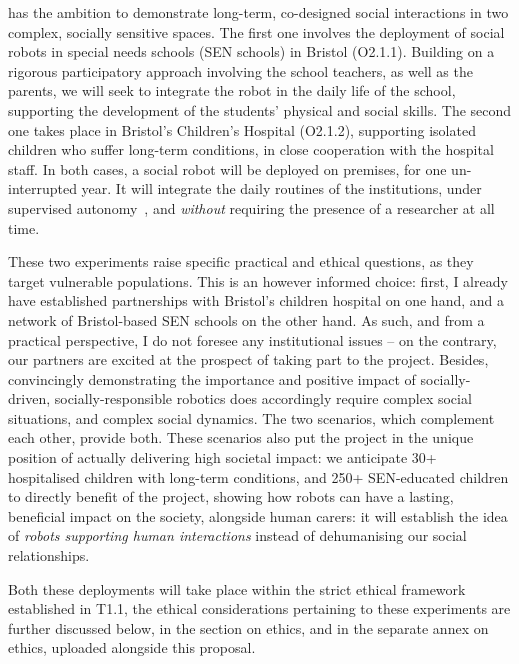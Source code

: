 \begin{rewrite}

\project has the ambition to demonstrate long-term, co-designed social
interactions in two complex, socially sensitive spaces.
The first one involves the deployment of social robots in special needs schools
(SEN schools) in Bristol (O2.1.1). Building on a rigorous participatory approach
involving the school teachers, as well as the parents, we will seek to integrate
the robot in the daily life of the school, supporting the development of the
students' physical and social skills. The second one takes place in Bristol's
Children's Hospital (O2.1.2), supporting isolated children who suffer long-term
conditions, in close cooperation with the hospital staff. In both cases, a
social robot will be deployed on premises, for one un-interrupted year. It will
integrate the daily routines of the institutions, under supervised
autonomy~\cite{senft2017supervised}, and \emph{without} requiring the
presence of a researcher at all time.

These two experiments raise specific practical and ethical questions, as they
target vulnerable populations. This is an however informed choice: first, I
already have established partnerships with Bristol's children hospital on one
hand, and a network of Bristol-based SEN schools on the other hand. As such, and
from a practical perspective, I do not foresee any institutional issues -- on
the contrary, our partners are excited at the prospect of taking part to the
project. Besides, convincingly demonstrating the importance and positive impact
of socially-driven, socially-responsible robotics does accordingly require
complex social situations, and complex social dynamics. The two scenarios, which
complement each other, provide both. These scenarios also put the project in the
unique position of actually delivering high societal impact: we anticipate 30+
hospitalised children with long-term conditions, and 250+ SEN-educated children
to directly benefit of the project, showing how robots can have a lasting,
beneficial impact on the society, alongside human carers: it will establish the
idea of \emph{robots supporting human interactions} instead of dehumanising our
social relationships.

Both these deployments will take place within the strict ethical framework
established in T1.1, the ethical considerations pertaining to these experiments
are further discussed below, in the section on ethics, and in the separate annex
on ethics, uploaded alongside this proposal.



\end{rewrite}
